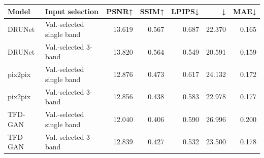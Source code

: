\begin{tabular}{@{}llrrrrr@{}}
\toprule
Model & Input selection & PSNR↑ & SSIM↑ & LPIPS↓ & \dE{}↓ & MAE↓\\
\midrule
DRUNet & Val.-selected single band & 13.619 & 0.567 & 0.687 & 22.370 & 0.165\\
DRUNet & Val.-selected 3-band & 13.820 & 0.564 & 0.549 & 20.591 & 0.159\\
pix2pix & Val.-selected single band & 12.876 & 0.473 & 0.617 & 24.132 & 0.172\\
pix2pix & Val.-selected 3-band & 12.856 & 0.438 & 0.583 & 22.978 & 0.177\\
TFD-GAN & Val.-selected single band & 12.040 & 0.406 & 0.590 & 26.996 & 0.200\\
TFD-GAN & Val.-selected 3-band & 12.839 & 0.427 & 0.532 & 23.500 & 0.178\\
\bottomrule
\end{tabular}
